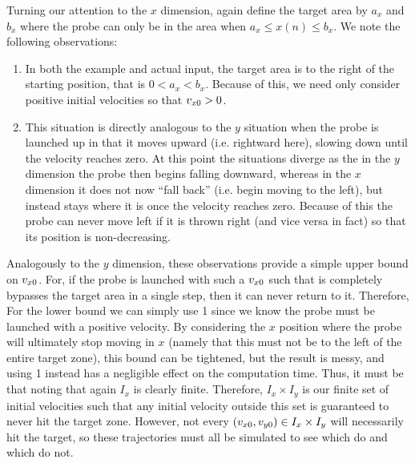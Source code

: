 \documentclass{article}
\begin{document}
{    Turning our attention to the $x$ dimension, again define the target area by $a_x$ and $b_x$ where the probe can only be in the area when $a_x \leq x(n) \leq b_x$.
    We note the following observations:
    \begin{enumerate}
        \item In both the example and actual input, the target area is to the right of the starting position, that is $0 < a_x < b_x$.
              Because of this, we need only consider positive initial velocities so that $v_{x0} > 0$.
        \item This situation is directly analogous to the $y$ situation when the probe is launched up in that it moves upward (i.e. rightward here), slowing down until the velocity reaches zero.
              At this point the situations diverge as the in the $y$ dimension the probe then begins falling downward, whereas in the $x$ dimension it does not now ``fall back'' (i.e. begin moving to the left), but instead stays where it is once the velocity reaches zero.
              Because of this the probe can never move left if it is thrown right (and vice versa in fact) so that its position is non-decreasing.
    \end{enumerate}
    Analogously to the $y$ dimension, these observations provide a simple upper bound on $v_{x0}$.
    For, if the probe is launched with such a $v_{x0}$ such that is completely bypasses the target area in a single step, then it can never return to it.
    Therefore,
    For the lower bound we can simply use 1 since we know the probe must be launched with a positive velocity.
    By considering the $x$ position where the probe will ultimately stop moving in $x$ (namely that this must not be to the left of the entire target zone), this bound can be tightened, but the result is messy, and using 1 instead has a negligible effect on the computation time.
    Thus, it must be that
    noting that again $I_x$ is clearly finite.
    Therefore, $I_x \times I_y$ is our finite set of initial velocities such that any initial velocity outside this set is guaranteed to never hit the target zone.
    However, not every $(v_{x0}, v_{y0}) \in I_x \times I_y$ will necessarily hit the target, so these trajectories must all be simulated to see which do and which do not.
}
\end{document}
